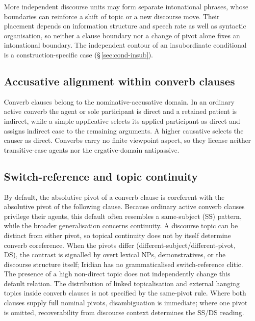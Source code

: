 More independent discourse units may form separate intonational phrases, whose
boundaries can reinforce a shift of topic or a new discourse move. Their
placement depends on information structure and speech rate as well as syntactic
organisation, so neither a clause boundary nor a change of pivot alone fixes
an intonational boundary. The independent contour of an insubordinate
conditional is a construction-specific case (§\,\ref{sec:cond-insub}).

\subsection{Accusative alignment within converb clauses}

Converb clauses belong to the nominative-accusative domain. In an ordinary
active converb the agent or sole participant is direct and a retained patient
is indirect, while a simple applicative selects its applied participant as
direct and assigns indirect case to the remaining arguments. A higher
causative selects the causer as direct. Converbs carry no finite viewpoint
aspect, so they license neither transitive-case agents nor the
ergative-domain antipassive.

\subsection{Switch-reference and topic continuity}\label{sec:switch-reference}

By default, the absolutive pivot of a converb clause is coreferent with the
absolutive pivot of the following clause. Because ordinary active converb
clauses privilege their agents, this default often resembles a same-subject
(SS) pattern, while the broader generalisation concerns 
 continuity. A discourse topic can be distinct from either pivot, so topical
 continuity does not by itself determine converb coreference. When
the pivots differ (different-subject/different-pivot, DS), the contrast is
signalled by overt lexical NPs, demonstratives, or the discourse structure
itself; Iridian has no grammaticalised switch-reference clitic. The presence of a
high non-direct topic does not independently change this default relation.
The distribution of linked topicalisation and external hanging topics inside
converb clauses is not specified by the same-pivot rule. Where both
clauses supply full nominal pivots, disambiguation is immediate; where one pivot
is omitted, recoverability from discourse context determines the SS/DS reading.

